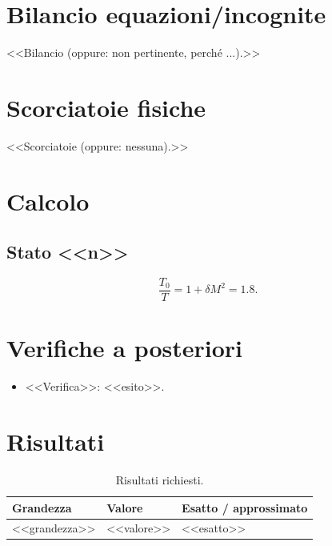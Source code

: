 \documentclass[11pt,a4paper]{article}
\begin{document}
\section{Bilancio equazioni/incognite}
<<Bilancio (oppure: non pertinente, perché ...).>>

\section{Scorciatoie fisiche}
<<Scorciatoie (oppure: nessuna).>>

\section{Calcolo}
\subsection{Stato <<n>>}
\[
  \frac{T_0}{T} = 1 + \delta M^2 = \num{1.8}.
\]

\section{Verifiche a posteriori}
\begin{itemize}
  \item <<Verifica>>: <<esito>>.
\end{itemize}

\section{Risultati}
\begin{table}[H]
  \centering
  \begin{tabular}{lll}
    \toprule
    Grandezza & Valore & Esatto / approssimato \\
    \midrule
    <<grandezza>> & <<valore>> & <<esatto>> \\
    \bottomrule
  \end{tabular}
  \caption{Risultati richiesti.}
\end{table}
\end{document}
